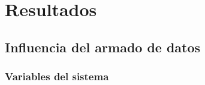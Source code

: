 \section{Resultados}
\subsection{Influencia del armado de datos}

\subsubsection{Variables del sistema}

